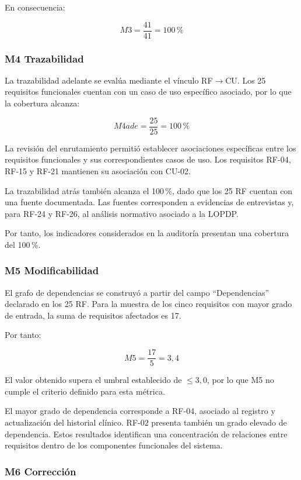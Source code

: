 En consecuencia:

\[
M3=\frac{41}{41}=100\,\%
\]

\subsubsection*{M4 Trazabilidad}

La trazabilidad adelante se evalúa mediante el vínculo
RF$\rightarrow$CU. Los 25 requisitos funcionales cuentan con un caso de uso
específico asociado, por lo que la cobertura alcanza:

\[
M4ade=\frac{25}{25}=100\,\%
\]

La revisión del enrutamiento permitió establecer asociaciones específicas entre
los requisitos funcionales y sus correspondientes casos de uso. Los requisitos
RF-04, RF-15 y RF-21 mantienen su asociación con CU-02.

La trazabilidad atrás también alcanza el 100\,\%, dado que los 25 RF cuentan
con una fuente documentada. Las fuentes corresponden a evidencias de
entrevistas y, para RF-24 y RF-26, al análisis normativo asociado a la LOPDP.

Por tanto, los indicadores considerados en la auditoría presentan una
cobertura del 100\,\%.

\subsubsection*{M5 Modificabilidad}

El grafo de dependencias se construyó a partir del campo
``Dependencias'' declarado en los 25 RF. Para la muestra de los cinco
requisitos con mayor grado de entrada, la suma de requisitos afectados es 17.

Por tanto:

\[
M5=\frac{17}{5}=3{,}4
\]

El valor obtenido supera el umbral establecido de $\leq 3{,}0$, por lo que
M5 no cumple el criterio definido para esta métrica.

El mayor grado de dependencia corresponde a RF-04, asociado al registro y
actualización del historial clínico. RF-02 presenta también un grado elevado
de dependencia. Estos resultados identifican una concentración de relaciones
entre requisitos dentro de los componentes funcionales del sistema.

\subsubsection*{M6 Corrección}

